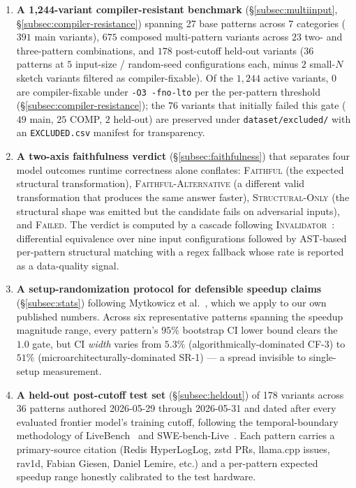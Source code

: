 \begin{enumerate}
\item \textbf{A 1{,}244-variant compiler-resistant benchmark} (\S\ref{subsec:multiinput}, \S\ref{subsec:compiler-resistance}) spanning 27 base patterns across 7 categories ($391$ main variants), $675$ composed multi-pattern variants across $23$ two- and three-pattern combinations, and $178$ post-cutoff held-out variants ($36$ patterns at $5$ input-size / random-seed configurations each, minus $2$ small-$N$ sketch variants filtered as compiler-fixable). Of the $1{,}244$ active variants, $0$ are compiler-fixable under \texttt{-O3 -fno-lto} per the per-pattern threshold (\S\ref{subsec:compiler-resistance}); the $76$ variants that initially failed this gate ($49$ main, $25$ COMP, $2$ held-out) are preserved under \texttt{dataset/excluded/} with an \texttt{EXCLUDED.csv} manifest for transparency.
\item \textbf{A two-axis faithfulness verdict} (\S\ref{subsec:faithfulness}) that separates four model outcomes runtime correctness alone conflates: \textsc{Faithful} (the expected structural transformation), \textsc{Faithful-Alternative} (a different valid transformation that produces the same answer faster), \textsc{Structural-Only} (the structural shape was emitted but the candidate fails on adversarial inputs), and \textsc{Failed}. The verdict is computed by a cascade following \textsc{Invalidator}~\cite{lecong2023invalidator}: differential equivalence over nine input configurations followed by AST-based per-pattern structural matching with a regex fallback whose rate is reported as a data-quality signal.
\item \textbf{A setup-randomization protocol for defensible speedup claims} (\S\ref{subsec:stats}) following Mytkowicz et al.~\cite{mytkowicz2009producing}, which we apply to our own published numbers. Across six representative patterns spanning the speedup magnitude range, every pattern's $95\%$ bootstrap CI lower bound clears the $1.0$ gate, but CI \emph{width} varies from $5.3\%$ (algorithmically-dominated CF-3) to $51\%$ (microarchitecturally-dominated SR-1) --- a spread invisible to single-setup measurement.
\item \textbf{A held-out post-cutoff test set} (\S\ref{subsec:heldout}) of 178 variants across 36 patterns authored 2026-05-29 through 2026-05-31 and dated after every evaluated frontier model's training cutoff, following the temporal-boundary methodology of LiveBench~\cite{livebench2024} and SWE-bench-Live~\cite{swebenchlive2025}. Each pattern carries a primary-source citation (Redis HyperLogLog, zstd PRs, llama.cpp issues, rav1d, Fabian Giesen, Daniel Lemire, etc.) and a per-pattern expected speedup range honestly calibrated to the test hardware.

\end{enumerate}
